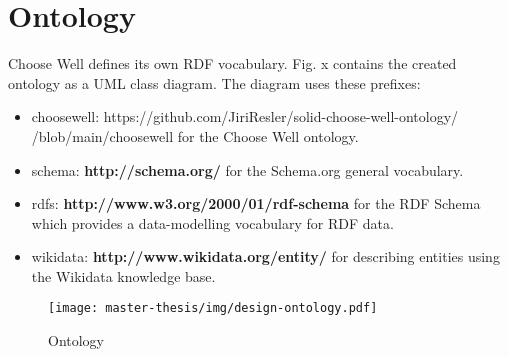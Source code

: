 \section{Ontology}
Choose Well defines its own RDF vocabulary. 
Fig. x contains the created ontology as a UML class diagram. 
The diagram uses these prefixes:
\begin{itemize}
  \item choosewell: https://github.com/JiriResler/solid-choose-well-ontology/ \newline /blob/main/choosewell for the Choose Well ontology.
  \item schema: \textbf{http://schema.org/} for the Schema.org general vocabulary. 
  \item rdfs: \textbf{http://www.w3.org/2000/01/rdf-schema} for the RDF Schema which provides a data-modelling vocabulary for RDF data.
  \item wikidata: \textbf{http://www.wikidata.org/entity/} for describing entities using the Wikidata knowledge base.
\end{itemize}

\begin{figure}[h]
  \centering
  \texttt{[image: master-thesis/img/design-ontology.pdf]}
  \caption{Ontology}
\end{figure}